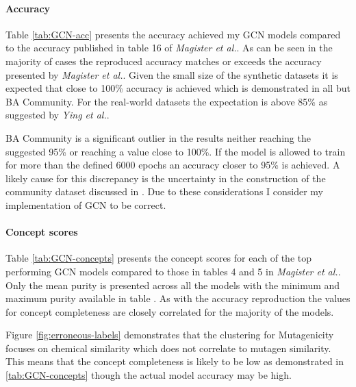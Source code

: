 \paragraph{Accuracy}

Table \ref{tab:GCN-acc} presents the accuracy achieved my GCN models compared to the accuracy published in table 16 of \textit{Magister et al.}\cite{magister2021gcexplainer}.
As can be seen in the majority of cases the reproduced accuracy matches or exceeds the accuracy presented by \textit{Magister et al.}.
Given the small size of the synthetic datasets it is expected that close to 100\% accuracy is achieved which is demonstrated in all but BA Community.
For the real-world datasets the expectation is above 85\% as suggested by \textit{Ying et al.}\cite{ying2019gnnexplainer}.

BA Community is a significant outlier in the results neither reaching the suggested 95\% or reaching a value close to 100\%.
If the model is allowed to train for more than the defined 6000 epochs an accuracy closer to 95\% is achieved.
A likely cause for this discrepancy is the uncertainty in the construction of the community dataset discussed in .
Due to these considerations I consider my implementation of GCN to be correct.

\paragraph{Concept scores}

Table \ref{tab:GCN-concepts} presents the concept scores for each of the top performing GCN models compared to those in tables 4 and 5 in \textit{Magister et al.}.
Only the mean purity is presented across all the models with the minimum and maximum purity available in table . As with the accuracy reproduction the values for concept completeness are closely correlated for the majority of the models.


Figure \ref{fig:erroneous-labels} demonstrates that the clustering for Mutagenicity focuses on chemical similarity which does not correlate to mutagen similarity.
This means that the concept completeness is likely to be low as demonstrated in \ref{tab:GCN-concepts} though the actual model accuracy may be high.

